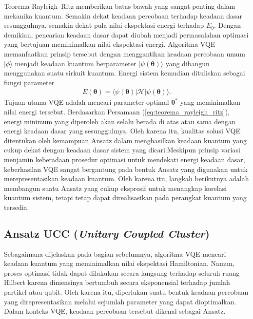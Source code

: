 Teorema Rayleigh--Ritz memberikan batas bawah yang sangat penting dalam mekanika kuantum. Semakin dekat keadaan percobaan terhadap keadaan dasar sesungguhnya, semakin dekat pula nilai ekspektasi energi terhadap $E_0$. Dengan demikian, pencarian keadaan dasar dapat diubah menjadi permasalahan optimasi yang bertujuan meminimalkan nilai ekspektasi energi. Algoritma VQE memanfaatkan prinsip tersebut dengan menggantikan keadaan percobaan umum $|\phi\rangle$ menjadi keadaan kuantum berparameter $|\psi(\boldsymbol{\theta})\rangle$ yang dibangun menggunakan suatu sirkuit kuantum. Energi sistem kemudian dituliskan sebagai fungsi parameter
\begin{equation}
    \begin{split}
    E(\boldsymbol{\theta}) = \langle \psi(\boldsymbol{\theta}) | \mathcal{H} | \psi(\boldsymbol{\theta}) \rangle.
    \end{split}
\end{equation}
Tujuan utama VQE adalah mencari parameter optimal $\boldsymbol{\theta}^*$ yang meminimalkan nilai energi tersebut. Berdasarkan Persamaan (\ref{eq:teorema_rayleigh_ritz}), energi minimum yang diperoleh akan selalu berada di atas atau sama dengan energi keadaan dasar yang sesungguhnya. Oleh karena itu, kualitas solusi VQE ditentukan oleh kemampuan Ansatz dalam menghasilkan keadaan kuantum yang cukup dekat dengan keadaan dasar sistem yang dicari.Meskipun prinsip variasi menjamin keberadaan prosedur optimasi untuk mendekati energi keadaan dasar, keberhasilan VQE sangat bergantung pada bentuk Ansatz yang digunakan untuk merepresentasikan keadaan kuantum. Oleh karena itu, langkah berikutnya adalah membangun suatu Ansatz yang cukup ekspresif untuk menangkap korelasi kuantum sistem, tetapi tetap dapat direalisasikan pada perangkat kuantum yang tersedia.

\subsection{Ansatz UCC (\textit{Unitary Coupled Cluster})}
Sebagaimana dijelaskan pada bagian sebelumnya, algoritma VQE mencari keadaan kuantum yang meminimalkan nilai ekspektasi Hamiltonian. Namun, proses optimasi tidak dapat dilakukan secara langsung terhadap seluruh ruang Hilbert karena dimensinya bertumbuh secara eksponensial terhadap jumlah partikel atau qubit. Oleh karena itu, diperlukan suatu bentuk keadaan percobaan yang direpresentasikan melalui sejumlah parameter yang dapat dioptimalkan. Dalam konteks VQE, keadaan percobaan tersebut dikenal sebagai Ansatz.


